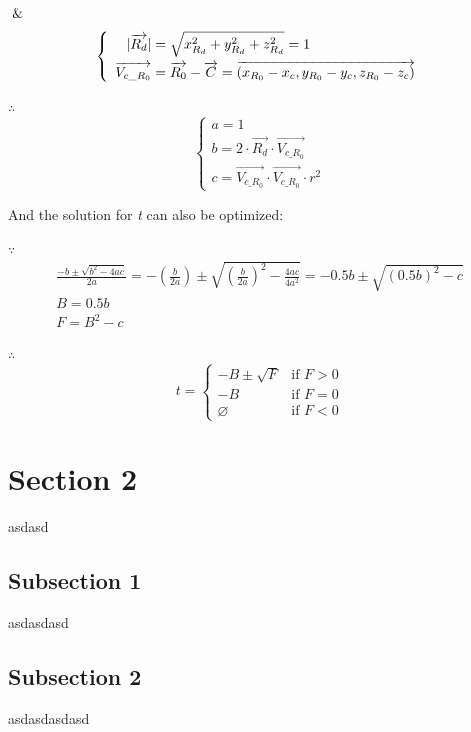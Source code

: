 $\And$
\[
\left\{
\begin{array}{lr}
\begin{aligned}
\lvert \overrightarrow{R_{d}} \rvert &= \sqrt{x_{R_{d}}^2 + y_{R_{d}}^2 + z_{R_{d}}^2} = 1 \\
\overrightarrow{V_{c\_R_{0}}} &= \overrightarrow{R_{0}} - \overrightarrow{C} = \overrightarrow{(x_{R_{0}} - x_{c}, y_{R_{0}} - y_{c}, z_{R_{0}} - z_{c})}
\end{aligned}
\end{array}
\right.
\]

$\therefore$
\[
\left\{
\begin{array}{lr}
a =1 \\
b = 2 \cdot \overrightarrow{R_{d}} \cdot \overrightarrow{V_{c\_R_{0}}} \\
c = \overrightarrow{V_{c\_R_{0}}} \cdot \overrightarrow{V_{c\_R_{0}}} \cdot r^2
\end{array}
\right.
\]

And the solution for \emph{t} can also be optimized:

$\because$
\[
\begin{array}{lr}
\frac{-b \pm \sqrt{b^2 - 4ac}}{2a} = -(\frac{b}{2a}) \pm \sqrt{(\frac{b}{2a})^2 - \frac{4ac}{4a^2}} = -0.5b \pm \sqrt{(0.5b)^2 - c} \\
B = 0.5b\\
F = B^2 - c
\end{array}
\]

$\therefore$
\[
t =
\begin{cases}
 -B \pm \sqrt{F} & \text{if } F > 0 \\
-B & \text{if } F = 0 \\
\varnothing & \text{if } F < 0
\end{cases}
\]




\section{Section 2}
asdasd

\subsection{Subsection 1}
asdasdasd

\subsection{Subsection 2}
asdasdasdasd

